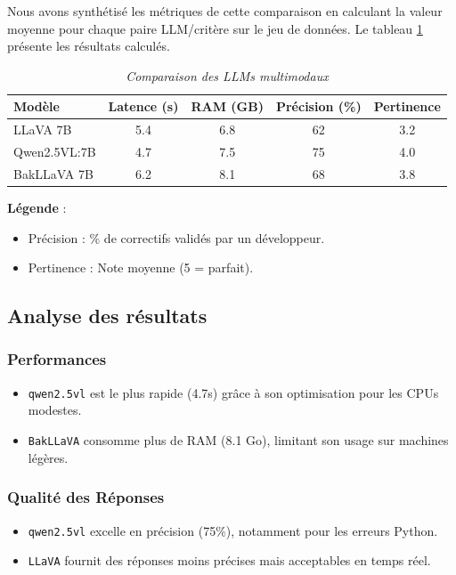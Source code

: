 \documentclass[12pt,a4paper]{report}
\begin{document}
	Nous avons synthétisé les métriques de cette comparaison en calculant la valeur moyenne pour chaque paire LLM/critère sur le jeu de données. Le tableau \ref{tab:tableau-benchmark} présente les résultats calculés.
	
	\begin{table}[H]  
		\centering  
		\caption{\textit{Comparaison des LLMs multimodaux}}
		\label{tab:tableau-benchmark}
		\begin{tabular}{|l|c|c|c|c|}  
			\hline  
			\textbf{Modèle} & \textbf{Latence (s)} & \textbf{RAM (GB)} & \textbf{Précision (\%)} & \textbf{Pertinence} \\  
			\hline  
			LLaVA 7B & 5.4 & 6.8 & 62 & 3.2 \\  
			Qwen2.5VL:7B & 4.7 & 7.5 & 75 & 4.0 \\  
			BakLLaVA 7B & 6.2 & 8.1 & 68 & 3.8 \\  
			\hline  
		\end{tabular}  
	\end{table}
	
	\textbf{Légende} :
	
	\begin{itemize}
		
		\item Précision : \% de correctifs validés par un développeur.
		
		\item Pertinence : Note moyenne (5 = parfait).
	\end{itemize}
	
	\subsection*{Analyse des résultats}
	
	\subsubsection*{Performances}
	\begin{itemize}
		\item \verb|qwen2.5vl| est le plus rapide (4.7s) grâce à son optimisation pour les CPUs modestes.
		\item \verb|BakLLaVA| consomme plus de RAM (8.1 Go), limitant son usage sur machines légères.
	\end{itemize}
	
	\subsubsection*{Qualité des Réponses}
	\begin{itemize}
		\item \verb|qwen2.5vl| excelle en précision (75\%), notamment pour les erreurs Python.
		\item \verb|LLaVA| fournit des réponses moins précises mais acceptables en temps réel.
	\end{itemize}
	
\end{document}

